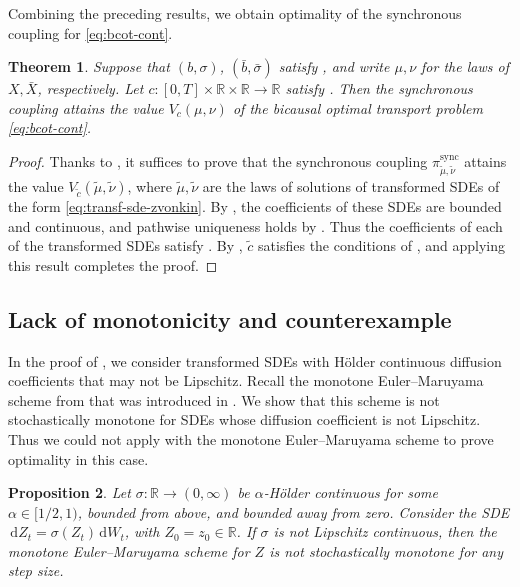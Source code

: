\documentclass[onseside, final]{amsart}
\newtheorem{theorem}{Theorem}[section]
\newtheorem{proposition}[theorem]{Proposition}
\theoremstyle{definition}
\newcommand{\R}{\mathbb R}
\newcommand{\D}{\,\mathrm{d}}
\newcommand{\sync}{\mathrm{sync}}
\numberwithin{equation}{section}
\begin{document}
	Combining the preceding results, we obtain optimality of the synchronous coupling for \eqref{eq:bcot-cont}.
	
	\begin{theorem}\label{thm:zvonkin-optimality}
		Suppose that $(b, \sigma)$, $(\bar b, \bar \sigma)$ satisfy , and write $\mu, \nu$ for the laws of $X, \bar X$, respectively. 
		Let $c \colon [0, T] \times \R \times \R \to \R$ satisfy . Then the synchronous coupling attains the value $V_c(\mu, \nu)$ of the bicausal optimal transport problem \eqref{eq:bcot-cont}.
	\end{theorem}
	 	
	\begin{proof}
		Thanks to , it suffices to prove that the synchronous coupling $\pi^\sync_{\tilde \mu, \tilde \nu}$ attains the value $V_{\tilde c}(\tilde \mu, \tilde \nu)$, where $\tilde \mu, \tilde \nu$ are the laws of solutions of transformed SDEs of the form \eqref{eq:transf-sde-zvonkin}. By , the coefficients of these SDEs are bounded and continuous, and pathwise uniqueness holds by \citet[Theorem 2]{YW2}. Thus the coefficients of each of the transformed SDEs satisfy . By , $\tilde c$ satisfies the conditions of , and applying this result completes the proof.
	\end{proof}
		
	\subsection{Lack of monotonicity and counterexample}\label{sec:counterexamples}
		
		In the proof of , we consider transformed SDEs with H\"older continuous diffusion coefficients that may not be Lipschitz. Recall the monotone Euler--Maruyama scheme from  that was introduced in \cite[Definition 3.13]{BaKaRo22}. We show that this scheme is not stochastically monotone for SDEs whose diffusion coefficient is not Lipschitz. Thus we could not apply  with the monotone Euler--Maruyama scheme to prove optimality in this case.
		
		\begin{proposition}\label{prop:non-monotone}
			Let $\sigma\colon \R \to (0, \infty)$ be $\alpha$-H\"older continuous for some $\alpha \in [1/2, 1)$, bounded from above, and bounded away from zero. Consider the SDE $\D Z_t = \sigma(Z_t) \D W_t$, with $Z_0 = z_0 \in \R$. If $\sigma$ is not Lipschitz continuous, then the monotone Euler--Maruyama scheme for $Z$ is not stochastically monotone for any step size.
		\end{proposition}
		
\end{document}
